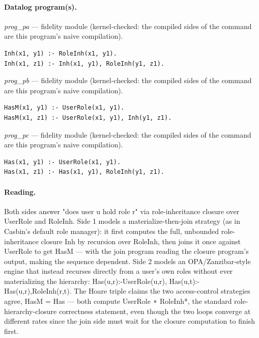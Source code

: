 \documentclass[10pt]{article}
\begin{document}
\paragraph{Datalog program(s).}

{\raggedright\textit{prog\_pa} --- fidelity module (kernel-checked: the compiled sides of the command are this program's naive compilation).\par}

\begin{Verbatim}[fontsize=\scriptsize,breaklines=true,breakanywhere=true,frame=single,framesep=1.5mm]
Inh(x1, y1) :- RoleInh(x1, y1).
Inh(x1, z1) :- Inh(x1, y1), RoleInh(y1, z1).
\end{Verbatim}

{\raggedright\textit{prog\_pb} --- fidelity module (kernel-checked: the compiled sides of the command are this program's naive compilation).\par}

\begin{Verbatim}[fontsize=\scriptsize,breaklines=true,breakanywhere=true,frame=single,framesep=1.5mm]
HasM(x1, y1) :- UserRole(x1, y1).
HasM(x1, z1) :- UserRole(x1, y1), Inh(y1, z1).
\end{Verbatim}

{\raggedright\textit{prog\_pc} --- fidelity module (kernel-checked: the compiled sides of the command are this program's naive compilation).\par}

\begin{Verbatim}[fontsize=\scriptsize,breaklines=true,breakanywhere=true,frame=single,framesep=1.5mm]
Has(x1, y1) :- UserRole(x1, y1).
Has(x1, z1) :- Has(x1, y1), RoleInh(y1, z1).
\end{Verbatim}

\paragraph{Reading.} Both sides answer "does user u hold role r" via role-inheritance closure over UserRole and RoleInh. Side 1 models a materialize-then-join strategy (as in Casbin's default role manager): it first computes the full, unbounded role-inheritance closure Inh by recursion over RoleInh, then joins it once against UserRole to get HasM --- with the join program reading the closure program's output, making the sequence dependent. Side 2 models an OPA/Zanzibar-style engine that instead recurses directly from a user's own roles without ever materializing the hierarchy: Has(u,r):-UserRole(u,r), Has(u,t):-Has(u,r),RoleInh(r,t). The Hoare triple claims the two access-control strategies agree, HasM = Has --- both compute UserRole ∘ RoleInh*, the standard role-hierarchy-closure correctness statement, even though the two loops converge at different rates since the join side must wait for the closure computation to finish first.
\end{document}
